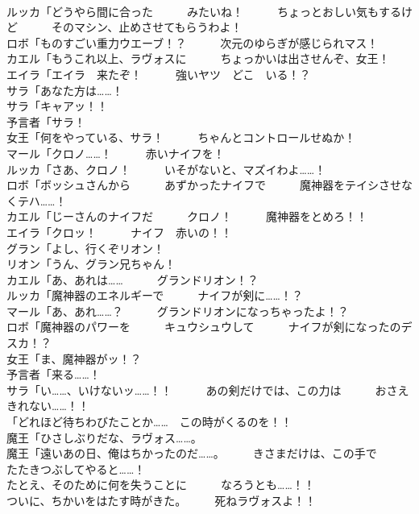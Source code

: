 \documentclass[8pt]{extreport}
\begin{document}
\begin{CJK}{UTF8}{min}
\\	ルッカ「どうやら間に合った　　　みたいね！　　　ちょっとおしい気もするけど　　　そのマシン、止めさせてもらうわよ！	
\\	ロボ「ものすごい重力ウエーブ！？　　　次元のゆらぎが感じられマス！	
\\	カエル「もうこれ以上、ラヴォスに　　　ちょっかいは出させんぞ、女王！	
\\	エイラ「エイラ　来たぞ！　　　強いヤツ　どこ　いる！？	
\\	サラ「あなた方は……！	
\\	サラ「キャアッ！！	
\\	予言者「サラ！	
\\	女王「何をやっている、サラ！　　　ちゃんとコントロールせぬか！	
\\	マール「クロノ……！　　　赤いナイフを！	
\\	ルッカ「さあ、クロノ！　　　いそがないと、マズイわよ……！	
\\	ロボ「ボッシュさんから　　　あずかったナイフで　　　魔神器をテイシさせなくテハ……！	
\\	カエル「じーさんのナイフだ　　　クロノ！　　　魔神器をとめろ！！	
\\	エイラ「クロッ！　　　ナイフ　赤いの！！	
\\	グラン「よし、行くぞリオン！	
\\	リオン「うん、グラン兄ちゃん！	
\\	カエル「あ、あれは……　　　グランドリオン！？	
\\	ルッカ「魔神器のエネルギーで　　　ナイフが剣に……！？	
\\	マール「あ、あれ……？　　　グランドリオンになっちゃったよ！？	
\\	ロボ「魔神器のパワーを　　　キュウシュウして　　　ナイフが剣になったのデスカ！？	
\\	女王「ま、魔神器がッ！？	
\\	予言者「来る……！	
\\	サラ「い……、いけないッ……！！　　　あの剣だけでは、この力は　　　おさえきれない……！！	
\\	「どれほど待ちわびたことか……　この時がくるのを！！	
\\	魔王「ひさしぶりだな、ラヴォス……。	
\\	魔王「遠いあの日、俺はちかったのだ……。　　　きさまだけは、この手で　　　たたきつぶしてやると……！	
\\	たとえ、そのために何を失うことに　　　なろうとも……！！	
\\	ついに、ちかいをはたす時がきた。　　　死ねラヴォスよ！！	

\end{CJK}
\end{document}
